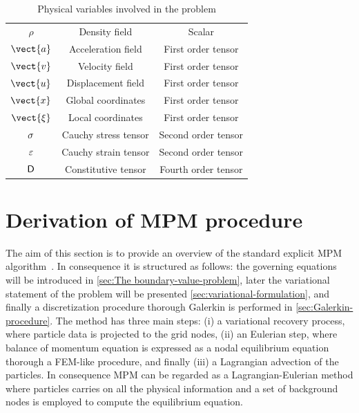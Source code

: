 \begin{table}
  \centering
  \caption{Physical variables involved in the problem}
  \label{tab:notation-table}
  \begin{tabular}{c c c}
    $\rho$ & Density field & Scalar \\
    $\vect{a}$ & Acceleration field & First order tensor \\
    $\vect{v}$ & Velocity field & First order tensor \\
    $\vect{u}$ & Displacement field & First order tensor \\
    $\vect{x}$ & Global coordinates & First order tensor \\
    $\vect{\xi}$ & Local coordinates & First order tensor \\
    $\mathsf{\sigma}$ & Cauchy stress tensor & Second order tensor \\
    $\mathsf{\varepsilon}$ & Cauchy strain tensor & Second order tensor \\
    $\mathsf{D}$ & Constitutive tensor & Fourth order tensor\\
  \end{tabular}
\end{table}

\section{Derivation of MPM procedure}
\label{sec:derivation-mpm}
The aim of this section is to provide an overview of the standard
explicit MPM algorithm~\cite{Sulsky1994}. In consequence it
is structured as follows: the governing equations will be introduced
in \ref{sec:The boundary-value-problem}, later the variational statement of
the problem will be presented \ref{sec:variational-formulation}, and
finally a discretization procedure thorough Galerkin is performed in
\ref{sec:Galerkin-procedure}. The method has three main steps: (i) a
variational recovery process, where particle data is projected to the
grid nodes, (ii) an Eulerian step, where balance of momentum equation
is expressed as a nodal equilibrium equation thorough a FEM-like
procedure, and finally (iii) a Lagrangian advection of the
particles. In consequence MPM can be regarded as a
Lagrangian-Eulerian method where particles carries on all the physical
information and a set of background nodes is employed to
compute the equilibrium equation.

